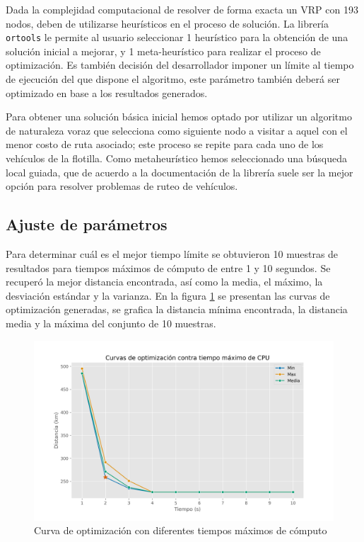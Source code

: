 \documentclass[journal]{IEEEtran}
\begin{document}
        Dada la complejidad computacional de resolver de forma exacta un VRP con 193 nodos, deben de utilizarse heurísticos en el proceso de solución. La librería \texttt{ortools} le permite al usuario seleccionar 1 heurístico para la obtención de una solución inicial a mejorar, y 1 meta-heurístico para realizar el proceso de optimización. Es también decisión del desarrollador imponer un límite al tiempo de ejecución del que dispone el algoritmo, este parámetro también deberá ser optimizado en base a los resultados generados.

        Para obtener una solución básica inicial hemos optado por utilizar un algoritmo de naturaleza voraz que selecciona como siguiente nodo a visitar a aquel con el menor costo de ruta asociado; este proceso se repite para cada uno de los vehículos de la flotilla. Como metaheurístico hemos seleccionado una búsqueda local guiada, que de acuerdo a la documentación de la librería \cite{google-2021} suele ser la mejor opción para resolver problemas de ruteo de vehículos.

        \subsection{Ajuste de parámetros} \label{sec:parameter-tuning}
            
            Para determinar cuál es el mejor tiempo límite se obtuvieron 10 muestras de resultados para tiempos máximos de cómputo de entre 1 y 10 segundos. Se recuperó la mejor distancia encontrada, así como la media, el máximo, la desviación estándar y la varianza. En la figura \ref{fig:optim-curves} se presentan las curvas de optimización generadas, se grafica la distancia mínima encontrada, la distancia media y la máxima del conjunto de 10 muestras.
            \begin{figure}[h!]
                \centering
                \includegraphics[scale=0.35]{../img/curvas-opt.png}
                \caption{Curva de optimización con diferentes tiempos máximos de cómputo}
                \label{fig:optim-curves}
            \end{figure}
\end{document}
